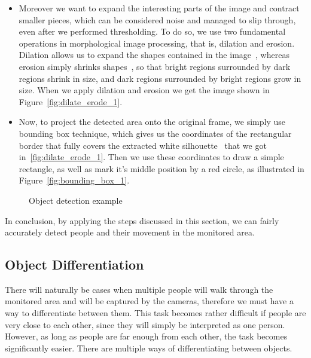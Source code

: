 \begin{itemize}
	\item Moreover we want to expand the interesting parts of the image and contract smaller pieces, which can be considered noise and managed to slip through, even after we performed thresholding. To do so, we use two fundamental operations in morphological image processing, that is, dilation and erosion. Dilation allows us to expand the shapes contained in the image~\cite{dilation_1}, whereas erosion simply shrinks shapes~\cite{erosion_1}, so that bright regions surrounded by dark regions shrink in size, and dark regions surrounded by bright regions grow in size. When we apply dilation and erosion we get the image shown in Figure~\ref{fig:dilate_erode_1}. 
	
	\item Now, to project the detected area onto the original frame, we simply use bounding box technique, which gives us the coordinates of the rectangular border that fully covers the extracted white silhouette~\cite{bounding_box_1} that we got in~\ref{fig:dilate_erode_1}. Then we use these coordinates to draw a simple rectangle, as well as mark it's middle position by a red circle, as illustrated in Figure~\ref{fig:bounding_box_1}.
	\end{itemize}
	\begin{figure}[ht]
		\centering
		\quad
		\quad
		\quad
		\caption{Object detection example}
		\label{fig:object_detection_example}
	\end{figure}
	
	In conclusion, by applying the steps discussed in this section, we can fairly accurately detect people and their movement in the monitored area.
	
	\subsection{Object Differentiation}
	There will naturally be cases when multiple people will walk through the monitored area and will be captured by the cameras, therefore we must have a way to differentiate between them. This task becomes rather difficult if people are very close to each other, since they will simply be interpreted as one person. However, as long as people are far enough from each other, the task becomes significantly easier. There are multiple ways of differentiating between objects. 
	

